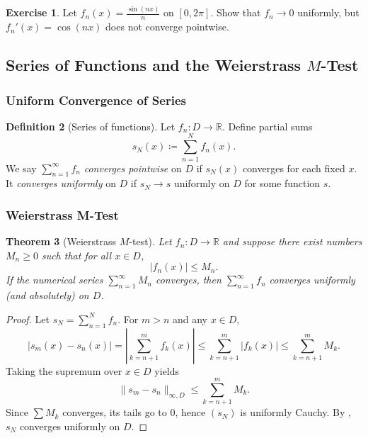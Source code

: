\documentclass[12pt]{article}
\numberwithin{equation}{section}
\def\abs#1{|#1|}
\newcommand{\RR}{\mathbb{R}}
\DeclarePairedDelimiter{\abs}{\lvert}{\rvert}
\theoremstyle{plain}
\newtheorem{theorem}{Theorem}[section]
\theoremstyle{definition}
\newtheorem{definition}[theorem]{Definition}
\newtheorem{exercise}[theorem]{Exercise}
\theoremstyle{remark}
\begin{document}
\begin{exercise}
Let $f_n(x)=\frac{\sin(nx)}{n}$ on $[0,2\pi]$.
Show that $f_n\to 0$ uniformly, but $f_n'(x)=\cos(nx)$ does not converge pointwise.
\end{exercise}

\newpage

\subsection{Series of Functions and the Weierstrass \texorpdfstring{$M$}{M}-Test}

\subsubsection{Uniform Convergence of Series}

\begin{definition}[Series of functions]\label{def:series-fn}
Let $f_n:D\to\RR$. Define partial sums
\[
s_N(x)\coloneqq \sum_{n=1}^{N} f_n(x).
\]
We say $\sum_{n=1}^\infty f_n$ \emph{converges pointwise} on $D$ if $s_N(x)$ converges for each fixed $x$.
It \emph{converges uniformly} on $D$ if $s_N\to s$ uniformly on $D$ for some function $s$.
\end{definition}

\subsubsection{Weierstrass M-Test}

\begin{theorem}[Weierstrass $M$-test]\label{thm:mtest}
Let $f_n:D\to\RR$ and suppose there exist numbers $M_n\ge 0$ such that for all $x\in D$,
\[
\abs{f_n(x)}\le M_n.
\]
If the numerical series $\sum_{n=1}^\infty M_n$ converges, then $\sum_{n=1}^\infty f_n$ converges uniformly (and absolutely) on $D$.
\end{theorem}

\begin{proof}
Let $s_N=\sum_{n=1}^N f_n$.
For $m>n$ and any $x\in D$,
\[
\abs{s_m(x)-s_n(x)}
=\abs{\sum_{k=n+1}^{m} f_k(x)}
\le \sum_{k=n+1}^{m}\abs{f_k(x)}
\le \sum_{k=n+1}^{m} M_k.
\]
Taking the supremum over $x\in D$ yields
\[
\|s_m-s_n\|_{\infty,D}\le \sum_{k=n+1}^{m} M_k.
\]
Since $\sum M_k$ converges, its tails go to $0$, hence $(s_N)$ is uniformly Cauchy.
By , $s_N$ converges uniformly on $D$.
\end{proof}
\end{document}
